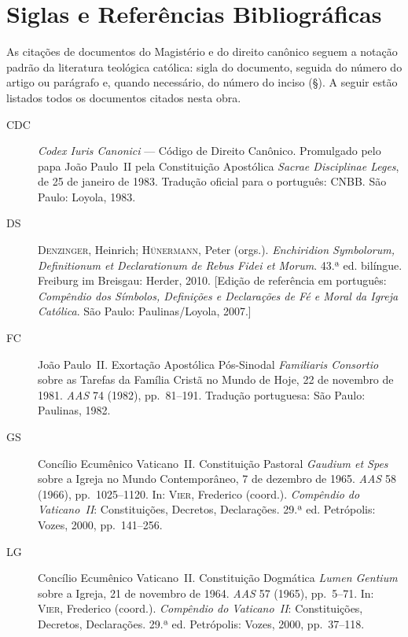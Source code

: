 \chapter*{Siglas e Referências Bibliográficas}

As citações de documentos do Magistério e do direito canônico seguem a notação padrão da literatura teológica católica: sigla do documento, seguida do número do artigo ou parágrafo e, quando necessário, do número do inciso (§). A seguir estão listados todos os documentos citados nesta obra.

\bigskip
\begin{description}

  \item[CDC] \textit{Codex Iuris Canonici} --- Código de Direito Canônico. Promulgado pelo papa João Paulo~II pela Constituição Apostólica \textit{Sacrae Disciplinae Leges}, de 25 de janeiro de 1983. Tradução oficial para o português: CNBB. São Paulo: Loyola, 1983.

  \item[DS] \textsc{Denzinger}, Heinrich; \textsc{Hünermann}, Peter (orgs.). \textit{Enchiridion Symbolorum, Definitionum et Declarationum de Rebus Fidei et Morum}. 43.ª ed. bilíngue. Freiburg im Breisgau: Herder, 2010. [Edição de referência em português: \textit{Compêndio dos Símbolos, Definições e Declarações de Fé e Moral da Igreja Católica}. São Paulo: Paulinas/Loyola, 2007.]

  \item[FC] João Paulo~II. Exortação Apostólica Pós-Sinodal \textit{Familiaris Consortio} sobre as Tarefas da Família Cristã no Mundo de Hoje, 22 de novembro de 1981. \textit{AAS} 74 (1982), pp.~81--191. Tradução portuguesa: São Paulo: Paulinas, 1982.

  \item[GS] Concílio Ecumênico Vaticano~II. Constituição Pastoral \textit{Gaudium et Spes} sobre a Igreja no Mundo Contemporâneo, 7 de dezembro de 1965. \textit{AAS} 58 (1966), pp.~1025--1120. In: \textsc{Vier}, Frederico (coord.). \textit{Compêndio do Vaticano~II}: Constituições, Decretos, Declarações. 29.ª ed. Petrópolis: Vozes, 2000, pp.~141--256.

  \item[LG] Concílio Ecumênico Vaticano~II. Constituição Dogmática \textit{Lumen Gentium} sobre a Igreja, 21 de novembro de 1964. \textit{AAS} 57 (1965), pp.~5--71. In: \textsc{Vier}, Frederico (coord.). \textit{Compêndio do Vaticano~II}: Constituições, Decretos, Declarações. 29.ª ed. Petrópolis: Vozes, 2000, pp.~37--118.


\end{description}
